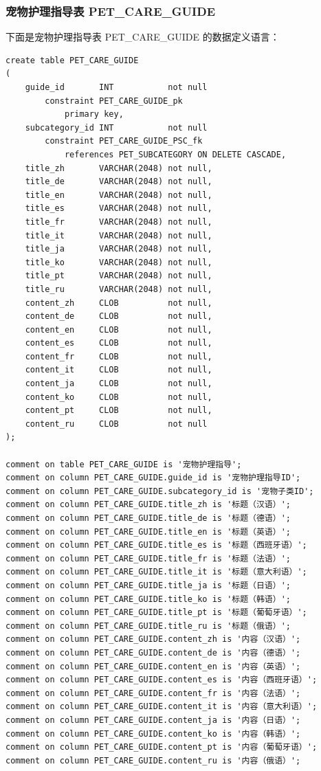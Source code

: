 \subsubsection{宠物护理指导表 PET\_CARE\_GUIDE}

下面是宠物护理指导表 PET\_CARE\_GUIDE 的数据定义语言：

\begin{verbatim}
create table PET_CARE_GUIDE
(
    guide_id       INT           not null
        constraint PET_CARE_GUIDE_pk
            primary key,
    subcategory_id INT           not null
        constraint PET_CARE_GUIDE_PSC_fk
            references PET_SUBCATEGORY ON DELETE CASCADE,
    title_zh       VARCHAR(2048) not null,
    title_de       VARCHAR(2048) not null,
    title_en       VARCHAR(2048) not null,
    title_es       VARCHAR(2048) not null,
    title_fr       VARCHAR(2048) not null,
    title_it       VARCHAR(2048) not null,
    title_ja       VARCHAR(2048) not null,
    title_ko       VARCHAR(2048) not null,
    title_pt       VARCHAR(2048) not null,
    title_ru       VARCHAR(2048) not null,
    content_zh     CLOB          not null,
    content_de     CLOB          not null,
    content_en     CLOB          not null,
    content_es     CLOB          not null,
    content_fr     CLOB          not null,
    content_it     CLOB          not null,
    content_ja     CLOB          not null,
    content_ko     CLOB          not null,
    content_pt     CLOB          not null,
    content_ru     CLOB          not null
);

comment on table PET_CARE_GUIDE is '宠物护理指导';
comment on column PET_CARE_GUIDE.guide_id is '宠物护理指导ID';
comment on column PET_CARE_GUIDE.subcategory_id is '宠物子类ID';
comment on column PET_CARE_GUIDE.title_zh is '标题（汉语）';
comment on column PET_CARE_GUIDE.title_de is '标题（德语）';
comment on column PET_CARE_GUIDE.title_en is '标题（英语）';
comment on column PET_CARE_GUIDE.title_es is '标题（西班牙语）';
comment on column PET_CARE_GUIDE.title_fr is '标题（法语）';
comment on column PET_CARE_GUIDE.title_it is '标题（意大利语）';
comment on column PET_CARE_GUIDE.title_ja is '标题（日语）';
comment on column PET_CARE_GUIDE.title_ko is '标题（韩语）';
comment on column PET_CARE_GUIDE.title_pt is '标题（葡萄牙语）';
comment on column PET_CARE_GUIDE.title_ru is '标题（俄语）';
comment on column PET_CARE_GUIDE.content_zh is '内容（汉语）';
comment on column PET_CARE_GUIDE.content_de is '内容（德语）';
comment on column PET_CARE_GUIDE.content_en is '内容（英语）';
comment on column PET_CARE_GUIDE.content_es is '内容（西班牙语）';
comment on column PET_CARE_GUIDE.content_fr is '内容（法语）';
comment on column PET_CARE_GUIDE.content_it is '内容（意大利语）';
comment on column PET_CARE_GUIDE.content_ja is '内容（日语）';
comment on column PET_CARE_GUIDE.content_ko is '内容（韩语）';
comment on column PET_CARE_GUIDE.content_pt is '内容（葡萄牙语）';
comment on column PET_CARE_GUIDE.content_ru is '内容（俄语）';
\end{verbatim}

